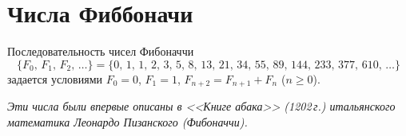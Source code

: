 

\section*{Числа Фиббоначи}


Последовательность чисел Фибоначчи
\[
    \{F_0, \, F_1, \, F_2, \, \ldots\}
=
    \{
        0, \, 1, \, 1, \, 2, \, 3, \, 5, \, 8, \,
        13, \, 21, \, 34, \, 55, \, 89, \,
        144, \, 233, \, 377, \, 610, \, \ldots
    \}
\]
задается условиями $F_0 = 0$, $F_1 = 1$,
$F_{n+2} = F_{n+1} + F_n$ ($n \geq 0$).


\emph{Эти числа были впервые описаны в <<Книге абака>> (1202\,г.)
итальянского математика Леонардо Пизанского (Фибоначчи).}

